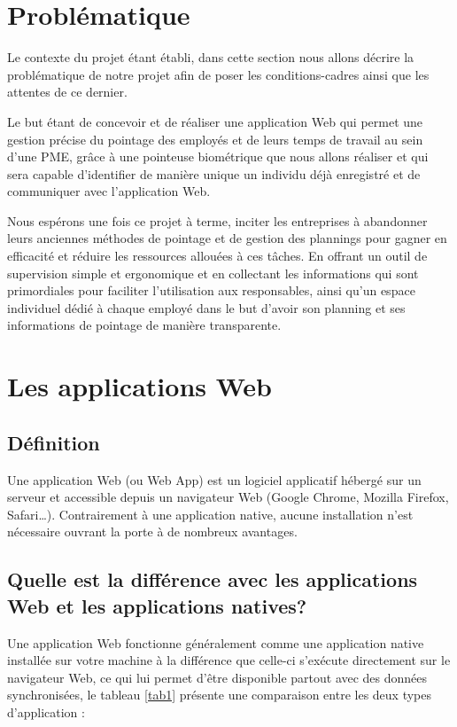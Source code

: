 \section{Problématique}
Le contexte du projet étant établi, dans cette section nous allons décrire la
problématique de notre projet afin de poser les conditions-cadres ainsi que les
attentes de ce dernier.

Le but étant de concevoir et de réaliser une application Web qui permet une
gestion précise du pointage des employés et de leurs temps de travail au sein
d’une PME, grâce à une pointeuse biométrique que nous allons réaliser et qui sera
capable d’identifier de manière unique un individu déjà enregistré et de
communiquer avec l’application Web.

Nous espérons une fois ce projet à terme, inciter les entreprises à abandonner
leurs anciennes méthodes de pointage et de gestion des plannings pour gagner en
efficacité et réduire les ressources allouées à ces tâches. En offrant un outil
de supervision simple et ergonomique et en collectant les informations qui sont
primordiales pour faciliter l’utilisation aux responsables, ainsi qu’un espace
individuel dédié à chaque employé dans le but d’avoir son planning et ses
informations de pointage de manière transparente.


\section{Les applications Web}

\subsection{Définition}
Une application Web (ou Web App) est un logiciel applicatif hébergé sur un
serveur et accessible depuis un navigateur Web (Google Chrome, Mozilla Firefox,
Safari…). Contrairement à une application native, aucune installation n’est
nécessaire ouvrant la porte à de nombreux avantages.
        
\subsection{Quelle est la différence avec les applications Web et les applications natives?}
Une application Web fonctionne généralement comme une application native
installée sur votre machine à la différence que celle-ci s’exécute directement
sur le navigateur Web, ce qui lui permet d’être disponible partout avec des
données synchronisées, le tableau \ref{tab1} présente une
comparaison entre les deux types d’application \cite{1} :
        
